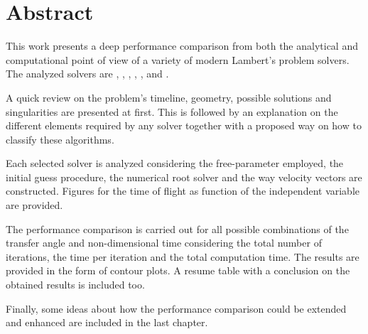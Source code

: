 \chapter*{Abstract}

This work presents a deep performance comparison from both the analytical and
computational point of view of a variety of modern Lambert's problem solvers.
The analyzed solvers are \cite{gauss1809}, \cite{battin1984},
\cite{gooding1990}, \cite{avanzini2008}, \cite{arora2013}, \cite{vallado2013}
and \cite{izzo2015}.

A quick review on the problem's timeline, geometry, possible solutions and
singularities are presented at first. This is followed by an explanation on the
different elements required by any solver together with a proposed way on how to
classify these algorithms.

Each selected solver is analyzed considering the free-parameter employed, the
initial guess procedure, the numerical root solver and the way velocity vectors
are constructed. Figures for the time of flight as function of the independent
variable are provided.

The performance comparison is carried out for all possible combinations of the
transfer angle and non-dimensional time considering the total number of
iterations, the time per iteration and the total computation time. The results
are provided in the form of contour plots. A resume table with a conclusion on
the obtained results is included too.

Finally, some ideas about how the performance comparison could be extended and
enhanced are included in the last chapter.
